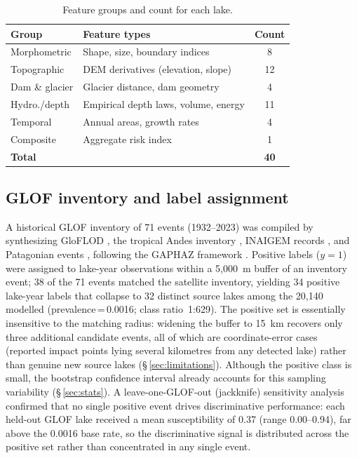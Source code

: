 \documentclass[pdflatex,sn-basic]{sn-jnl}%
\begin{document}
\begin{table}[!t]
\caption{Feature groups and count for each lake.}
\label{tab:feature_groups}
\centering
\begin{tabular}{llc}
\toprule
\textbf{Group} & \textbf{Feature types} & \textbf{Count} \\
\midrule
Morphometric        & Shape, size, boundary indices       & 8 \\
Topographic         & DEM derivatives (elevation, slope)  & 12 \\
Dam \& glacier      & Glacier distance, dam geometry      & 4 \\
Hydro./depth        & Empirical depth laws, volume, energy & 11 \\
Temporal            & Annual areas, growth rates          & 4 \\
Composite           & Aggregate risk index                & 1 \\
\midrule
\textbf{Total} & & \textbf{40} \\
\bottomrule
\end{tabular}
\end{table}

\subsection{GLOF inventory and label assignment}

A historical GLOF inventory of 71 events (1932--2023) was compiled by
synthesizing GloFLOD \citep{Lutzow2023}, the tropical Andes inventory
\citep{Emmer2022}, INAIGEM records \citep{INAIGEM2018}, and Patagonian
events \citep{IribarrenAnacona2015}, following the GAPHAZ framework
\citep{GAPHAZ2017}. Positive labels ($y\!=\!1$) were assigned to
lake-year observations within a 5{,}000~m buffer of an inventory event;
38 of the 71 events matched the satellite inventory, yielding 34 positive
lake-year labels that collapse to 32 distinct source lakes among the
20{,}140 modelled (prevalence\,=\,0.0016; class ratio~1:629). The positive
set is essentially insensitive to the matching radius: widening the buffer
to 15~km recovers only three additional candidate events, all of which are
coordinate-error cases (reported impact points lying several kilometres
from any detected lake) rather than genuine new source lakes
(\S\,\ref{sec:limitations}). Although the positive class is small, the
bootstrap confidence interval already accounts for this sampling
variability (\S\,\ref{sec:stats}).
A leave-one-GLOF-out (jackknife) sensitivity analysis confirmed that
no single positive event drives discriminative performance: each held-out
GLOF lake received a mean susceptibility of 0.37 (range 0.00--0.94), far
above the 0.0016 base rate, so the discriminative signal is distributed
across the positive set rather than concentrated in any single event.
\end{document}
